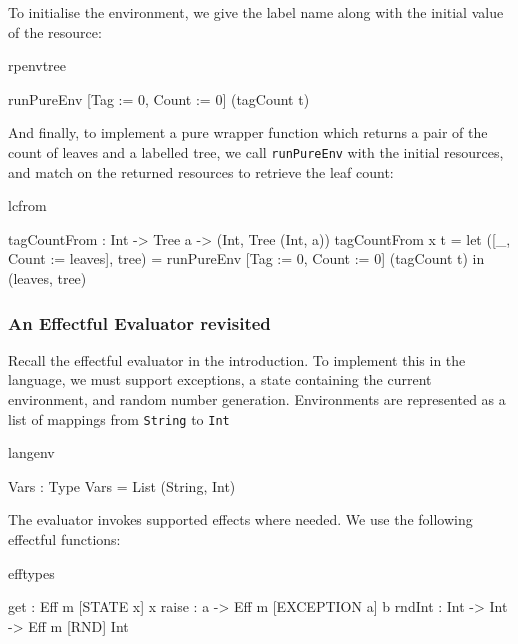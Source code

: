 \noindent
To initialise the environment, we give the label name along with the initial
value of the resource:

\begin{SaveVerbatim}{rpenvtree}

runPureEnv [Tag := 0, Count := 0] (tagCount t) 

\end{SaveVerbatim}

\noindent
And finally, to implement a pure wrapper function which returns a pair of the
count of leaves and a labelled tree, we call \texttt{runPureEnv} with the
initial resources, and match on the returned resources to retrieve the leaf
count:

\begin{SaveVerbatim}{lcfrom}

tagCountFrom : Int -> Tree a -> (Int, Tree (Int, a))
tagCountFrom x t 
    = let ([_, Count := leaves], tree) =
       runPureEnv [Tag := 0, Count := 0] (tagCount t)
          in (leaves, tree)

\end{SaveVerbatim}

\subsubsection{An Effectful Evaluator revisited}

Recall the effectful evaluator in the introduction. To implement this
in the \Eff{} language, we must support exceptions, a state containing the
current environment, and random number generation. Environments are
represented as a list of mappings from \texttt{String} to \texttt{Int}

\begin{SaveVerbatim}{langenv}

Vars : Type
Vars = List (String, Int)

\end{SaveVerbatim}

\noindent
The evaluator invokes supported effects where needed. We use the following
effectful functions:

\begin{SaveVerbatim}{efftypes}

get    : Eff m [STATE x] x
raise  : a -> Eff m [EXCEPTION a] b
rndInt : Int -> Int -> Eff m [RND] Int

\end{SaveVerbatim}

